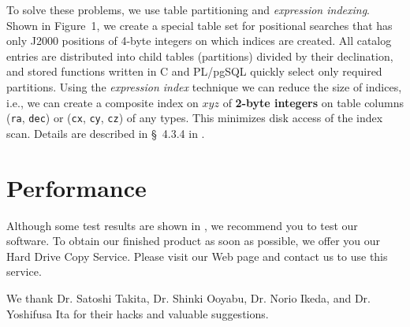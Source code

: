 To solve these problems, we use table partitioning and {\it expression indexing}. Shown in Figure~1, we create a special table set for positional searches that has only J2000 positions of 4-byte integers on which indices are created. All catalog entries are distributed into child tables (partitions) divided by their declination, and stored functions written in C and PL/pgSQL quickly select only required partitions. Using the {\it expression index} technique we can reduce the size of indices, i.e., we can create a composite index on $x$$y$$z$ of {\bf 2-byte integers} on table columns ({\tt ra}, {\tt dec}) or ({\tt cx}, {\tt cy}, {\tt cz}) of any types. This minimizes disk access of the index scan. Details are described in \S~4.3.4 in \citet{yam_2011a}.


\section{Performance}

Although some test results are shown in \citet{yam_2011a}, we recommend you to test our software. To obtain our finished product as soon as possible, we offer you our Hard Drive Copy Service. Please visit our Web page and contact us to use this service. 

\acknowledgements We thank 
Dr. Satoshi Takita, Dr. Shinki Ooyabu, Dr. Norio Ikeda, and Dr. Yoshifusa Ita for their hacks and valuable suggestions.



